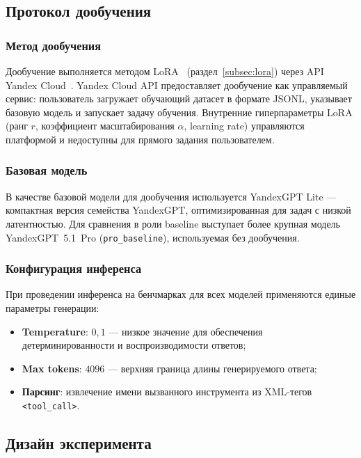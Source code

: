 \subsection{Протокол дообучения} \label{subsec:training}

\subsubsection{Метод дообучения}

Дообучение выполняется методом LoRA~\cite{hu2022lora} (раздел~\ref{subsec:lora}) через API Yandex Cloud~\cite{yandexgpt2024docs}. Yandex Cloud API предоставляет дообучение как управляемый сервис: пользователь загружает обучающий датасет в формате JSONL, указывает базовую модель и запускает задачу обучения. Внутренние гиперпараметры LoRA (ранг $r$, коэффициент масштабирования $\alpha$, learning rate) управляются платформой и недоступны для прямого задания пользователем.

\subsubsection{Базовая модель}

В качестве базовой модели для дообучения используется YandexGPT Lite --- компактная версия семейства YandexGPT, оптимизированная для задач с низкой латентностью. Для сравнения в роли baseline выступает более крупная модель YandexGPT~5.1~Pro (\texttt{pro\_baseline}), используемая без дообучения.

\subsubsection{Конфигурация инференса}

При проведении инференса на бенчмарках для всех моделей применяются единые параметры генерации:
\begin{itemize}
    \item \textbf{Temperature}: $0{,}1$ --- низкое значение для обеспечения детерминированности и воспроизводимости ответов;
    \item \textbf{Max tokens}: $4096$ --- верхняя граница длины генерируемого ответа;
    \item \textbf{Парсинг}: извлечение имени вызванного инструмента из XML-тегов \texttt{<tool\_call>}.
\end{itemize}

\subsection{Дизайн эксперимента} \label{subsec:design}

